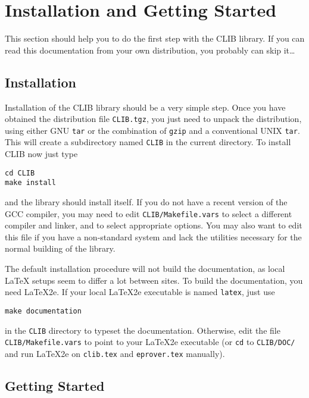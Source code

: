
\section{Installation and Getting Started}
\label{sec:install_start}

This section should help you to do the first step with the CLIB
library. If you can read this documentation from your own
distribution, you probably can skip it\ldots

\subsection{Installation}
\label{sec:install_start:install}

Installation of the CLIB library should be a very simple step. Once
you have obtained the distribution file \texttt{CLIB.tgz}, you just
need to unpack the distribution, using either GNU \texttt{tar} or the
combination of \texttt{gzip} and a conventional UNIX
\texttt{tar}. This will create a subdirectory named \texttt{CLIB} in
the current directory. To install CLIB now just type 

\begin{verbatim}
cd CLIB
make install
\end{verbatim}
and the library should install itself. If you do not have a recent
version of the GCC compiler, you may need to edit
\texttt{CLIB/Makefile.vars} to select a different compiler and linker, and
to select appropriate options. You may also want to edit this file if
you have a non-standard system and lack the utilities necessary for
the normal building of the library.

The default installation procedure will not build the documentation,
as local \LaTeX{} setups seem to differ a lot between sites. To
build the documentation, you need \LaTeX2e{}. If your local \LaTeX2e{}
executable is named \texttt{latex}, just use

\begin{verbatim}
make documentation
\end{verbatim}
in the \texttt{CLIB} directory to typeset the documentation.
Otherwise, edit the file \texttt{CLIB/Makefile.vars} to point to your
\LaTeX2e{} executable (or \texttt{cd} to \texttt{CLIB/DOC/} and run
\LaTeX2e{} on \texttt{clib.tex} and \texttt{eprover.tex} manually).

\subsection{Getting Started}
\label{sec:install_start:start}

